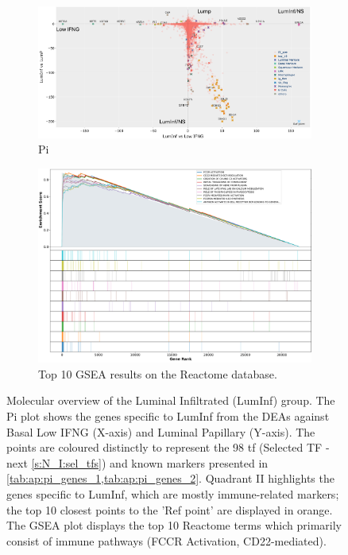 \begin{figure}[H]
    \centering
    \captionsetup{font=small} 
    \begin{subfigure}[!t]{1.0\textwidth}
        \includegraphics[width=\textwidth,keepaspectratio]{Sections/ClusteringAnalysis/Resources/discussion/other_groups/lumInf_pi.png}
        \caption{Pi}
        \label{fig:cs:lumInf_pi}
    \end{subfigure}
    \centering
    \begin{subfigure}[!t]{0.9\textwidth}
        \includegraphics[width=\textwidth, keepaspectratio]{Sections/ClusteringAnalysis/Resources/discussion/other_groups/lumInf_reactome_10_top.png}
        \caption{Top 10 GSEA results on the Reactome database.}
        \label{fig:cs:lumInf_gsea}
    \end{subfigure} 
    \centering
    \caption[LumInf-like - molecular overview: GSEA and Pi-plot]{Molecular overview of the Luminal Infiltrated (LumInf) group. The Pi plot shows the genes specific to LumInf from the DEAs against Basal Low IFNG (X-axis) and Luminal Papillary (Y-axis). The points are coloured distinctly to represent the 98 \acrlong{tf} (Selected TF - next \cref{s:N_I:sel_tfs}) and known markers presented in \cref{tab:ap:pi_genes_1,tab:ap:pi_genes_2}. Quadrant II highlights the genes specific to LumInf, which are mostly immune-related markers; the top 10 closest points to the 'Ref point' are displayed in orange. The GSEA plot displays the top 10 Reactome terms which primarily consist of immune pathways (FCCR Activation, CD22-mediated).}
    \label{fig:cs:lumInf}
\end{figure}


